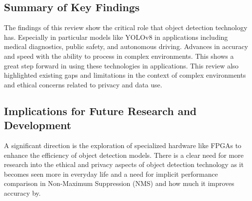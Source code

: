 \documentclass[11pt,journal,compsoc]{IEEEtran}
\begin{document}
\subsection{Summary of Key Findings}
The findings of this review show the critical role that object detection technology has. Especially in particular models like YOLOv8 in applications including medical diagnostics, public safety, and autonomous driving. Advances in accuracy and speed with the ability to process in complex environments. This shows a great step forward in using these technologies in applications. This review also highlighted existing gaps and limitations in the context of complex environments and ethical concerns related to privacy and data use.

\subsection{Implications for Future Research and Development}
A significant direction is the exploration of specialized hardware like FPGAs to enhance the efficiency of object detection models. There is a clear need for more research into the ethical and privacy aspects of object detection technology as it becomes seen more in everyday life and a need for implicit performance comparison in Non-Maximum Suppression (NMS) and how much it improves accuracy by. 

\printbibliography
\end{document}
